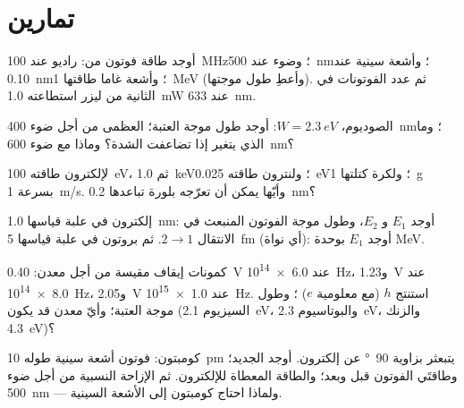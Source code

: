 \section{تمارين}

\begin{exercise}[$\star$]\label{exo:b1:quantum-introduction:1}
أوجد طاقة فوتون من: راديو عند \qty{100}{MHz}؛ وضوء عند \qty{500}{nm}؛
وأشعة سينية عند \qty{0.10}{nm}؛ وأشعة غاما طاقتها \qty{1}{MeV} (وأعطِ
طول موجتها). ثم عدد الفوتونات في الثانية من ليزر استطاعته \qty{1.0}{mW} عند
\qty{633}{nm}.
\end{exercise}

\begin{exercise}[$\star$]\label{exo:b1:quantum-introduction:2}
الصوديوم، $W = \qty{2.3}{eV}$: أوجد طول موجة العتبة؛  العظمى
 من أجل ضوء \qty{400}{nm}؛ وما الذي يتغير إذا تضاعفت
الشدة؟ وماذا مع ضوء \qty{600}{nm}؟
\end{exercise}

\begin{exercise}[$\star$]\label{exo:b1:quantum-introduction:3}
 لإلكترون طاقته \qty{100}{eV}، ثم \qty{1.0}{keV}؛
ولنترون طاقته \qty{0.025}{eV}؛ ولكرة كتلتها \qty{1}{g} بسرعة \qty{1}{m/s}.
وأيّها يمكن أن تعرّجه بلورة تباعدها \qty{0.2}{nm}؟
\end{exercise}

\begin{exercise}[$\star$]\label{exo:b1:quantum-introduction:4}
إلكترون في علبة قياسها \qty{1.0}{nm}: أوجد $E_1$ و $E_2$، وطول موجة
الفوتون المنبعث في الانتقال $2 \to 1$. ثم بروتون في علبة قياسها \qty{5}{fm}
(أي نواة): أوجد $E_1$ بوحدة \unit{MeV}.
\end{exercise}

\begin{exercise}[$\star\star$]\label{exo:b1:quantum-introduction:5}
كمونات إيقاف مقيسة من أجل معدن: \qty{0.40}{V} عند
\qty{6.0e14}{Hz}، و\qty{1.23}{V} عند \qty{8.0e14}{Hz}، و\qty{2.05}{V} عند
\qty{1.0e15}{Hz}. استنتج $h$ (مع معلومية $e$) ؛
وطول موجة العتبة؛ وأيّ معدن قد يكون (السيزيوم \qty{2.1}{eV}،
والبوتاسيوم \qty{2.3}{eV}، والزنك \qty{4.3}{eV})؟
\end{exercise}

\begin{exercise}[$\star\star$]\label{exo:b1:quantum-introduction:6}
كومبتون: فوتون أشعة سينية طوله \qty{10}{pm} يتبعثر بزاوية \qty{90}{\degree} عن
إلكترون. أوجد  الجديد؛ وطاقتَي الفوتون قبل وبعد؛ والطاقة
المعطاة للإلكترون. ثم الإزاحة النسبية من أجل ضوء \qty{500}{nm} --- ولماذا
احتاج كومبتون إلى الأشعة السينية.
\end{exercise}

